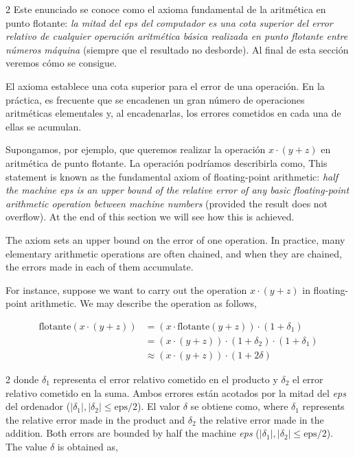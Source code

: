 \begin{paracol}{2}
Este enunciado se conoce como el axioma fundamental de la aritmética en punto flotante: \emph{la mitad del eps del computador es una cota superior del error relativo de cualquier operación aritmética básica realizada en punto flotante entre números máquina} (siempre que el resultado no desborde). Al final de esta sección veremos cómo se consigue.

El axioma establece una cota superior para el error de una operación. En la práctica, es frecuente que se encadenen un gran número de operaciones aritméticas elementales y, al encadenarlas, los errores cometidos en cada una de ellas se acumulan.

Supongamos, por ejemplo, que queremos realizar la operación $x\cdot(y+z)$ en aritmética de punto flotante. La operación podríamos describirla como,
\switchcolumn
This statement is known as the fundamental axiom of floating-point arithmetic: \emph{half the machine eps is an upper bound of the relative error of any basic floating-point arithmetic operation between machine numbers} (provided the result does not overflow). At the end of this section we will see how this is achieved.

The axiom sets an upper bound on the error of one operation. In practice, many elementary arithmetic operations are often chained, and when they are chained, the errors made in each of them accumulate.

For instance, suppose we want to carry out the operation $x\cdot(y+z)$ in floating-point arithmetic. We may describe the operation as follows,
\end{paracol}

\begin{align*}
\text{flotante}\left(x\cdot (y+z)\right)& =\left(x\cdot\text{flotante}(y+z)\right)\cdot(1+\delta_1)\\
 & = (x\cdot(y+z))\cdot(1+\delta_2)\cdot(1+\delta_1)\\
 & \approx (x\cdot(y+z))\cdot(1+2\delta)
\end{align*}

\begin{paracol}{2}
donde $\delta_1$ representa el error relativo cometido en el producto y $\delta_2$ el error relativo cometido en la suma. Ambos errores están acotados por la mitad del \emph{eps} del ordenador ($\vert\delta_1\vert, \vert\delta_2\vert \leq \text{eps}/2$). El valor $\delta$ se obtiene como,
\switchcolumn
where $\delta_1$ represents the relative error made in the product and $\delta_2$ the relative error made in the addition. Both errors are bounded by half the machine \emph{eps} ($\vert\delta_1\vert, \vert\delta_2\vert \leq \text{eps}/2$). The value $\delta$ is obtained as,
\end{paracol}

